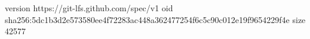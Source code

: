 version https://git-lfs.github.com/spec/v1
oid sha256:5dc1b3d2e573580ee4f72283ac448a362477254f6c5c90c012e19f9654229f4e
size 42577
